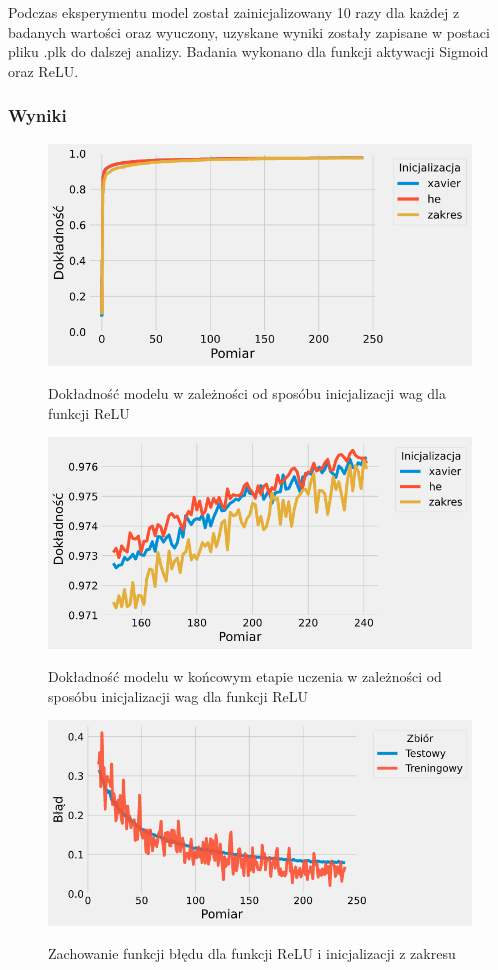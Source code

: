\documentclass{article}
\begin{document}
Podczas eksperymentu model został zainicjalizowany 10 razy dla każdej z badanych wartości oraz wyuczony, uzyskane wyniki zostały zapisane w postaci pliku .plk do dalszej analizy. Badania wykonano dla funkcji aktywacji Sigmoid oraz ReLU.

\subsubsection*{Wyniki}
\begin{figure}[H]
	\centering
	\caption{Dokładność modelu w zależności od sposóbu inicjalizacji wag dla funkcji ReLU}
	\includegraphics[width=\textwidth]{relu_init_acc.png}
	\label{fig:res201}
\end{figure}
\begin{figure}[H]
	\centering
	\caption{Dokładność modelu w końcowym etapie uczenia w zależności od sposóbu inicjalizacji wag dla funkcji ReLU}
	\includegraphics[width=\textwidth]{relu_init_acc_zoom.png}
	\label{fig:res202}
\end{figure}
\begin{figure}[H]
	\centering
	\caption{Zachowanie funkcji błędu dla funkcji ReLU i inicjalizacji z zakresu}
	\includegraphics[width=\textwidth]{relu_init_zak.png}
	\label{fig:res203}
\end{figure}
\end{document}

